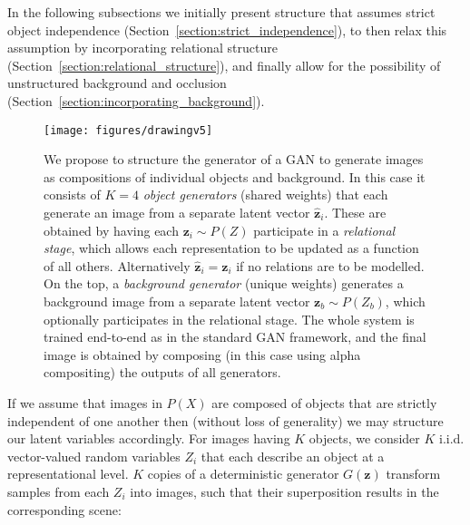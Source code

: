 \documentclass{article}
\begin{document}
In the following subsections we initially present structure that assumes strict object independence (Section~\ref{section:strict_independence}), to then relax this assumption by incorporating relational structure (Section~\ref{section:relational_structure}), and finally allow for the possibility of unstructured background and occlusion (Section~\ref{section:incorporating_background}).

\begin{figure}
    \centering
    \texttt{[image: figures/drawingv5]}
    \caption{We propose to structure the generator of a GAN to generate images as compositions of individual objects and background. In this case it consists of $K=4$ \emph{object generators} (shared weights) that each generate an image from a separate latent vector $\bm{\hat{z}}_i$. These are obtained by having each $\bm{z}_i \sim P(Z)$ participate in a \emph{relational stage}, which allows each representation to be updated as a function of all others. Alternatively $\bm{\hat{z}}_i=\bm{z}_i$ if no relations are to be modelled. On the top, a \emph{background generator} (unique weights) generates a background image from a separate latent vector $\bm{z}_b \sim P(Z_b)$, which optionally participates in the relational stage. The whole system is trained end-to-end as in the standard GAN framework, and the final image is obtained by composing (in this case using alpha compositing) the outputs of all generators.}
    \label{fig:drawing}
\end{figure}%

If we assume that images in $P(X)$ are composed of objects that are strictly independent of one another then (without loss of generality) we may structure our latent variables accordingly.
For images having $K$ objects, we consider $K$ i.i.d. vector-valued random variables $Z_{i}$ that each describe an object at a representational level.
$K$ copies of a deterministic generator $G(\bm{z})$ transform samples from each $Z_{i}$ into images, such that their superposition results in the corresponding scene:
\end{document}
